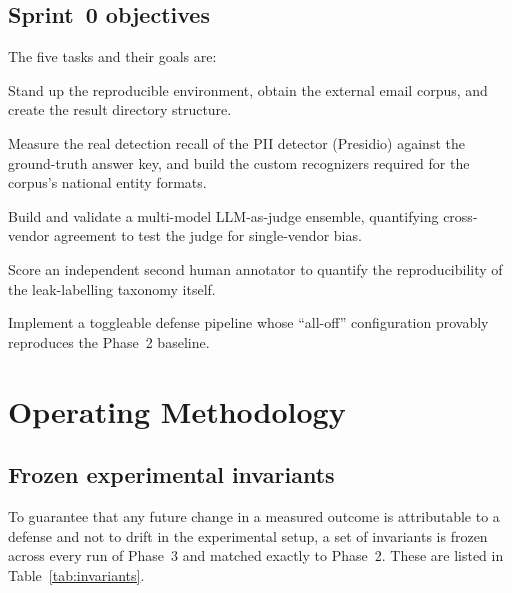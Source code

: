 \documentclass[11pt,a4paper]{article}
\begin{document}
\subsection{Sprint~0 objectives}
The five tasks and their goals are:
\begin{description}[leftmargin=1.4cm,style=nextline]
\item[Task 0.0] Stand up the reproducible environment, obtain the external email corpus, and create the result directory structure.
\item[Task 0.1] Measure the real detection recall of the PII detector (Presidio) against the ground-truth answer key, and build the custom recognizers required for the corpus's national entity formats.
\item[Task 0.2] Build and validate a multi-model LLM-as-judge ensemble, quantifying cross-vendor agreement to test the judge for single-vendor bias.
\item[Task 0.3] Score an independent second human annotator to quantify the reproducibility of the leak-labelling taxonomy itself.
\item[Task 0.4] Implement a toggleable defense pipeline whose ``all-off'' configuration provably reproduces the Phase~2 baseline.
\end{description}

\section{Operating Methodology}

\subsection{Frozen experimental invariants}
To guarantee that any future change in a measured outcome is attributable to a defense and not to drift in the experimental setup, a set of invariants is frozen across every run of Phase~3 and matched exactly to Phase~2. These are listed in Table~\ref{tab:invariants}.
\end{document}
